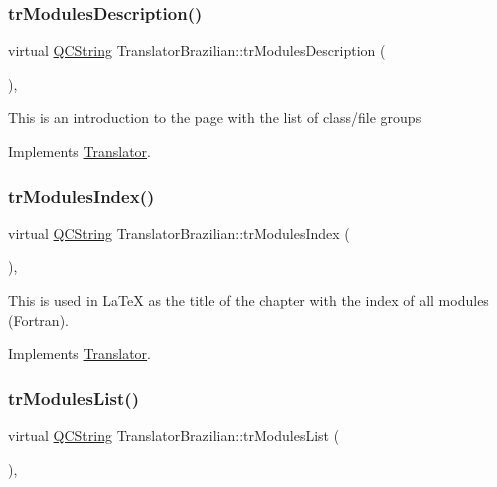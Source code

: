 \subsubsection{\texorpdfstring{trModulesDescription()}{trModulesDescription()}}
{\footnotesize\ttfamily virtual \mbox{\hyperlink{class_q_c_string}{Q\+C\+String}} Translator\+Brazilian\+::tr\+Modules\+Description (\begin{DoxyParamCaption}{ }\end{DoxyParamCaption})\hspace{0.3cm}{\ttfamily [inline]}, {\ttfamily [virtual]}}

This is an introduction to the page with the list of class/file groups 

Implements \mbox{\hyperlink{class_translator}{Translator}}.

\mbox{\label{class_translator_brazilian_a70509c21bad29b4898ac21db0fc1547f}} 
\subsubsection{\texorpdfstring{trModulesIndex()}{trModulesIndex()}}
{\footnotesize\ttfamily virtual \mbox{\hyperlink{class_q_c_string}{Q\+C\+String}} Translator\+Brazilian\+::tr\+Modules\+Index (\begin{DoxyParamCaption}{ }\end{DoxyParamCaption})\hspace{0.3cm}{\ttfamily [inline]}, {\ttfamily [virtual]}}

This is used in La\+TeX as the title of the chapter with the index of all modules (Fortran). 

Implements \mbox{\hyperlink{class_translator}{Translator}}.

\mbox{\label{class_translator_brazilian_ae67a8cdc202cde314662a95de2a9f9da}} 
\subsubsection{\texorpdfstring{trModulesList()}{trModulesList()}}
{\footnotesize\ttfamily virtual \mbox{\hyperlink{class_q_c_string}{Q\+C\+String}} Translator\+Brazilian\+::tr\+Modules\+List (\begin{DoxyParamCaption}{ }\end{DoxyParamCaption})\hspace{0.3cm}{\ttfamily [inline]}, {\ttfamily [virtual]}}

